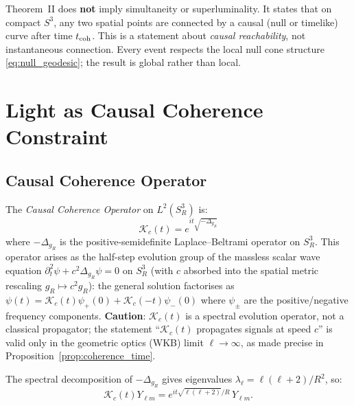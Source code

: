 \documentclass[12pt,a4paper]{article}
\theoremstyle{plain}
\theoremstyle{definition}
\theoremstyle{remark}
\begin{document}
\begin{tcolorbox}[remarkbox={Remark 4.1 — Non-Simultaneity}]
Theorem~II does \textbf{not} imply simultaneity or superluminality.
It states that on compact $S^3$, any two spatial points are connected by a
causal (null or timelike) curve after time $t_{\rm coh}$.
This is a statement about \emph{causal reachability}, not instantaneous connection.
Every event respects the local null cone structure \eqref{eq:null_geodesic}; the
result is global rather than local.
\end{tcolorbox}

\section{Light as Causal Coherence Constraint}
\label{sec:coherence}

\subsection{Causal Coherence Operator}

\begin{tcolorbox}[defbox={Definition 5.1 — Causal Coherence Operator}]
The \emph{Causal Coherence Operator} on $L^2(S^3_R)$ is:
\begin{equation}
  \mathcal{K}_c(t) = e^{it\sqrt{-\Delta_{g_R}}}
  \label{eq:Kc}
\end{equation}
where $-\Delta_{g_R}$ is the positive-semidefinite Laplace--Beltrami operator on $S^3_R$.
This operator arises as the half-step evolution group of the massless scalar wave
equation $\partial_t^2\psi + c^2\Delta_{g_R}\psi = 0$ on $S^3_R$ (with $c$ absorbed
into the spatial metric rescaling $g_R \mapsto c^2 g_R$):
the general solution factorises as
$\psi(t) = \mathcal{K}_c(t)\psi_+(0) + \mathcal{K}_c(-t)\psi_-(0)$
where $\psi_\pm$ are the positive/negative frequency components.
\textbf{Caution}: $\mathcal{K}_c(t)$ is a spectral evolution operator,
not a classical propagator; the statement ``$\mathcal{K}_c(t)$ propagates
signals at speed $c$'' is valid only in the geometric optics (WKB) limit
$\ell \to \infty$, as made precise in Proposition~\ref{prop:coherence_time}.
\end{tcolorbox}

The spectral decomposition of $-\Delta_{g_R}$ gives eigenvalues
$\lambda_\ell = \ell(\ell+2)/R^2$, so:
\begin{equation}
  \mathcal{K}_c(t) Y_{\ell m} = e^{it\sqrt{\ell(\ell+2)}/R}\,Y_{\ell m}.
  \label{eq:Kc_spectral}
\end{equation}
\end{document}
